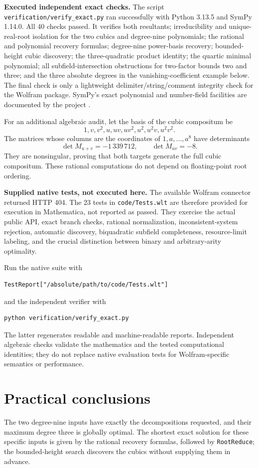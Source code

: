 \documentclass[11pt,a4paper]{article}
\theoremstyle{definition}\newtheorem{definition}[theorem]{Definition}
\theoremstyle{remark}\newtheorem{remark}[theorem]{Remark}
\newcommand{\wl}[1]{\texttt{#1}}
\begin{document}
\textbf{Executed independent exact checks.} The script \wl{verification/verify\_exact.py} ran successfully with Python 3.13.5 and SymPy 1.14.0. All 40 checks passed. It verifies both resultants; irreducibility and unique-real-root isolation for the two cubics and degree-nine polynomials; the rational and polynomial recovery formulas; degree-nine power-basis recovery; bounded-height cubic discovery; the three-quadratic product identity; the quartic minimal polynomial; all subfield-intersection obstructions for two-factor bounds two and three; and the three absolute degrees in the vanishing-coefficient example below. The final check is only a lightweight delimiter/string/comment integrity check for the Wolfram package. SymPy's exact polynomial and number-field facilities are documented by the project \cite{sympy}.

For an additional algebraic audit, let the basis of the cubic compositum be
\[
 1,v,v^2,u,uv,uv^2,u^2,u^2v,u^2v^2.
\]
The matrices whose columns are the coordinates of $1,a,\ldots,a^8$ have determinants
\[
 \det M_{u+v}=-1\,339\,712,\qquad \det M_{uv}=-8.
\]
They are nonsingular, proving that both targets generate the full cubic compositum. These rational computations do not depend on floating-point root ordering.

\textbf{Supplied native tests, not executed here.} The available Wolfram connector returned HTTP 404. The 23 tests in \wl{code/Tests.wlt} are therefore provided for execution in Mathematica, not reported as passed. They exercise the actual public API, exact branch checks, rational normalization, inconsistent-system rejection, automatic discovery, biquadratic subfield completeness, resource-limit labeling, and the crucial distinction between binary and arbitrary-arity optimality.

Run the native suite with
\begin{lstlisting}
TestReport["/absolute/path/to/code/Tests.wlt"]
\end{lstlisting}
and the independent verifier with
\begin{lstlisting}[language={},basicstyle=\ttfamily\small]
python verification/verify_exact.py
\end{lstlisting}
The latter regenerates readable and machine-readable reports. Independent algebraic checks validate the mathematics and the tested computational identities; they do not replace native evaluation tests for Wolfram-specific semantics or performance.

\section{Practical conclusions}
The two degree-nine inputs have exactly the decompositions requested, and their maximum degree three is globally optimal. The shortest exact solution for these specific inputs is given by the rational recovery formulas, followed by \wl{RootReduce}; the bounded-height search discovers the cubics without supplying them in advance.
\end{document}
